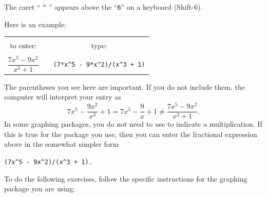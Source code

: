 \noindent The caret `` \verb+^+ '' appears above the ``{\tt 6}'' on a
keyboard (Shift-6).


\noindent  Here is an example:
\begin{center}
	\begin{tabular}{ccc}
	to enter: & \rule{24pt}{0pt} & type: \\ 
	$\dfrac{7 x^5 - 9 x^2}{x^3 + 1}$
		& \rule{0pt}{20pt} & 
		\verb!(7*x^5 - 9*x^2)/(x^3 + 1)!
	\end{tabular}
\end{center}


\noindent The parentheses you see here are important.  If you do not
include them, the computer will interpret your entry as
\[
7 x^5 - \dfrac{9 x^2}{x^3} + 1 = 
		7 x^5 - \dfrac{9}{x} + 1 \neq 
		\dfrac{7 x^5 - 9 x^2}{x^3 + 1}.
\]
In some graphing packages, you do not need to use {\tt *} to indicate
a multiplication.  If this is true for the package you use, then you
can enter the fractional expression above in the somewhat simpler form

\begin{center}
		\verb!(7x^5 - 9x^2)/(x^3 + 1).!
\end{center}
To do the following exercises, follow the specific instructions for
the graphing package you are using.


